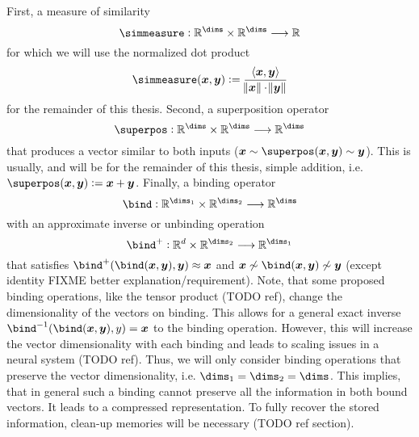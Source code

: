 First, a measure of similarity
\begin{equation}
    \simmeasure: \mathbb{R}^{\dims} \times \mathbb{R}^{\dims} \longrightarrow \mathbb{R}
\end{equation}
for which we will use the normalized dot product
\begin{equation}
    \simmeasure(\vc x, \vc y) := \frac{\left\langle \vc x, \vc y \right\rangle}{\norm{\vc x} \cdot \norm{\vc y}}
\end{equation}
for the remainder of this thesis.
Second, a superposition operator
\begin{equation}
    \superpos: \mathbb{R}^{\dims} \times \mathbb{R}^{\dims} \longrightarrow \mathbb{R}^{\dims}
\end{equation}
that produces a vector similar to both inputs ($\vc x \sim \superpos(\vc x, \vc y) \sim \vc y$).
This is usually, and will be for the remainder of this thesis, simple addition, i.e. $\superpos(\vc x, \vc y) := \vc x + \vc y$.
Finally, a binding operator
\begin{equation}
    \bind: \mathbb{R}^{\dims_1} \times \mathbb{R}^{\dims_2} \longrightarrow \mathbb{R}^{\dims}
\end{equation}
with an approximate inverse or unbinding operation
\begin{equation}
    \bind^+: \mathbb{R}^d \times \mathbb{R}^{\dims_2} \longrightarrow \mathbb{R}^{\dims_1}
\end{equation}
that satisfies $\bind^+(\bind(\vc x, \vc y), \vc y) \approx \vc x$ and $\vc x \not \sim \bind(\vc x, \vc y) \not \sim \vc y$ (except identity FIXME better explanation/requirement).
Note, that some proposed binding operations, like the tensor product (TODO ref), change the dimensionality of the vectors on binding.
This allows for a general exact inverse $\bind^{-1}(\bind(\vc x, \vc y), y) = \vc x$ to the binding operation.
However, this will increase the vector dimensionality with each binding and leads to scaling issues in a neural system (TODO ref).
Thus, we will only consider binding operations that preserve the vector dimensionality, i.e. $\dims_1 = \dims_2 = \dims$.
This implies, that in general such a binding cannot preserve all the information in both bound vectors.
It leads to a compressed representation.
To fully recover the stored information, clean-up memories will be necessary (TODO ref section).

